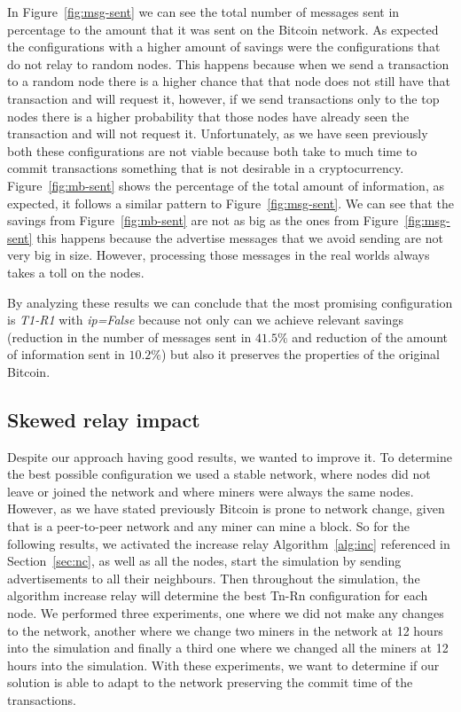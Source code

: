\documentclass{dads}   %
\begin{document}
In Figure~\ref{fig:msg-sent} we can see the total number of messages sent in percentage to the amount that it was sent on the Bitcoin network. As expected the configurations with a higher amount of savings were the configurations that do not relay to random nodes. This happens because when we send a transaction to a random node there is a higher chance that that node does not still have that transaction and will request it, however, if we send transactions only to the top nodes there is a higher probability that those nodes have already seen the transaction and will not request it. Unfortunately, as we have seen previously both these configurations are not viable because both take to much time to commit transactions something that is not desirable in a cryptocurrency. Figure~\ref{fig:mb-sent} shows the percentage of the total amount of information, as expected, it follows a similar pattern to Figure~\ref{fig:msg-sent}. We can see that the savings from Figure~\ref{fig:mb-sent} are not as big as the ones from Figure~\ref{fig:msg-sent} this happens because the advertise messages that we avoid sending are not very big in size. However, processing those messages in the real worlds always takes a toll on the nodes.

By analyzing these results we can conclude that the most promising configuration is \textsl{T1-R1} with \textsl{ip=False} because not only can we achieve relevant savings (reduction in the number of messages sent in $41.5\%$ and reduction of the amount of information sent in $10.2\%$) but also it preserves the properties of the original Bitcoin.

\subsection{Skewed relay impact}
Despite our approach having good results, we wanted to improve it. To determine the best possible configuration we used a stable network, where nodes did not leave or joined the network and where miners were always the same nodes. However,  as we have stated previously Bitcoin is prone to network change, given that is a peer-to-peer network and any miner can mine a block. So for the following results, we activated the increase relay Algorithm~\ref{alg:inc} referenced in Section~\ref{sec:nc}, as well as all the nodes, start the simulation by sending advertisements to all their neighbours. Then throughout the simulation, the algorithm increase relay will determine the best Tn-Rn configuration for each node. We performed three experiments, one where we did not make any changes to the network, another where we change two miners in the network at 12 hours into the simulation and finally a third one where we changed all the miners at 12 hours into the simulation. With these experiments, we want to determine if our solution is able to adapt to the network preserving the commit time of the transactions.
\end{document}
